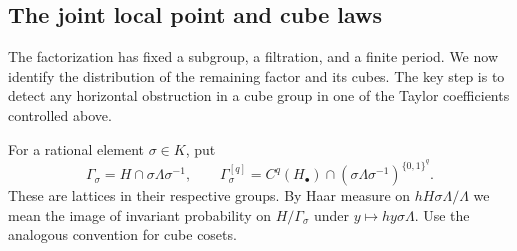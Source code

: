 \subsection{The joint local point and cube laws}

The factorization has fixed a subgroup, a filtration, and a finite
period.  We now identify the distribution of the remaining factor
and its cubes.  The key step is to detect any horizontal obstruction
in a cube group in one of the Taylor coefficients controlled above.

For a rational element $\sigma\in K$, put
\[
 \Gamma_\sigma=H\cap\sigma\Lambda\sigma^{-1},\qquad
 \Gamma^{[q]}_\sigma
 =C^q(H_\bullet)\cap
     (\sigma\Lambda\sigma^{-1})^{\{0,1\}^q}.
\]
These are lattices in their respective groups.  By Haar measure on
$hH\sigma\Lambda/\Lambda$ we mean the image of invariant probability on
$H/\Gamma_\sigma$ under $y\mapsto hy\sigma\Lambda$.  Use the analogous
convention for cube cosets.

